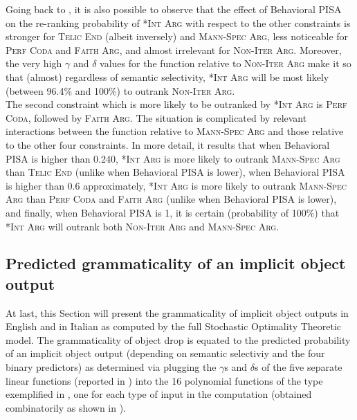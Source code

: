 Going back to , it is also possible to observe that the effect of Behavioral PISA on the re-ranking probability of \textsc{*Int Arg} with respect to the other constraints is stronger for \textsc{Telic End} (albeit inversely) and \textsc{Mann-Spec Arg}, less noticeable for \textsc{Perf Coda} and \textsc{Faith Arg}, and almost irrelevant for \textsc{Non-Iter Arg}. Moreover, the very high $\gamma$ and $\delta$ values for the function relative to \textsc{Non-Iter Arg} make it so that (almost) regardless of semantic selectivity, \textsc{*Int Arg} will be most likely (between 96.4\% and 100\%) to outrank \textsc{Non-Iter Arg}.\\
The second constraint which is more likely to be outranked by \textsc{*Int Arg} is \textsc{Perf Coda}, followed by \textsc{Faith Arg}. The situation is complicated by relevant interactions between the function relative to \textsc{Mann-Spec Arg} and those relative to the other four constraints. In more detail, it results that when Behavioral PISA is higher than 0.240, \textsc{*Int Arg} is more likely to outrank \textsc{Mann-Spec Arg} than \textsc{Telic End} (unlike when Behavioral PISA is lower), when Behavioral PISA is higher than 0.6 approximately, \textsc{*Int Arg} is more likely to outrank \textsc{Mann-Spec Arg} than \textsc{Perf Coda} and \textsc{Faith Arg} (unlike when Behavioral PISA is lower), and finally, when Behavioral PISA is 1, it is certain (probability of 100\%) that \textsc{*Int Arg} will outrank both \textsc{Non-Iter Arg} and \textsc{Mann-Spec Arg}.



\subsection{Predicted grammaticality of an implicit object output} 

At last, this Section will present the grammaticality of implicit object outputs in English and in Italian as computed by the full Stochastic Optimality Theoretic model. The grammaticality of object drop is equated to the predicted probability of an implicit object output (depending on semantic selectiviy and the four binary predictors) as determined via plugging the $\gamma$s and $\delta$s of the five separate linear functions (reported in ) into the 16 polynomial functions of the type exemplified in , one for each type of input in the computation (obtained combinatorily as shown in ).


